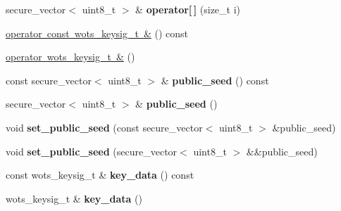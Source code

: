 \begin{DoxyCompactItemize}
\item 
\mbox{\label{class_botan_1_1_x_m_s_s___w_o_t_s___public_key_a6182be51cb89f842beee52781b39c624}} 
secure\+\_\+vector$<$ uint8\+\_\+t $>$ \& {\bfseries operator\mbox{[}$\,$\mbox{]}} (size\+\_\+t i)
\item 
\mbox{\hyperlink{class_botan_1_1_x_m_s_s___w_o_t_s___public_key_a2fb35383de7e366cfa3033609ced1f57}{operator const wots\+\_\+keysig\+\_\+t \&}} () const
\item 
\mbox{\hyperlink{class_botan_1_1_x_m_s_s___w_o_t_s___public_key_a086c1c4b5e5eb289a56a972e17124863}{operator wots\+\_\+keysig\+\_\+t \&}} ()
\item 
\mbox{\label{class_botan_1_1_x_m_s_s___w_o_t_s___public_key_af2047e200c02832dab036ef51da076c6}} 
const secure\+\_\+vector$<$ uint8\+\_\+t $>$ \& {\bfseries public\+\_\+seed} () const
\item 
\mbox{\label{class_botan_1_1_x_m_s_s___w_o_t_s___public_key_a74f242bbcf675a4d2f5507cb44c89a96}} 
secure\+\_\+vector$<$ uint8\+\_\+t $>$ \& {\bfseries public\+\_\+seed} ()
\item 
\mbox{\label{class_botan_1_1_x_m_s_s___w_o_t_s___public_key_aa5c05f34ee40b753ff5f37eade68bf69}} 
void {\bfseries set\+\_\+public\+\_\+seed} (const secure\+\_\+vector$<$ uint8\+\_\+t $>$ \&public\+\_\+seed)
\item 
\mbox{\label{class_botan_1_1_x_m_s_s___w_o_t_s___public_key_a991b1b9045643b610f7a23d22bc83c95}} 
void {\bfseries set\+\_\+public\+\_\+seed} (secure\+\_\+vector$<$ uint8\+\_\+t $>$ \&\&public\+\_\+seed)
\item 
\mbox{\label{class_botan_1_1_x_m_s_s___w_o_t_s___public_key_a70b4ae300ac80392f20eafbf11d1515c}} 
const wots\+\_\+keysig\+\_\+t \& {\bfseries key\+\_\+data} () const
\item 
\mbox{\label{class_botan_1_1_x_m_s_s___w_o_t_s___public_key_aa5ca3163c0b51419b3d6c573ced14c97}} 
wots\+\_\+keysig\+\_\+t \& {\bfseries key\+\_\+data} ()

\end{DoxyCompactItemize}
